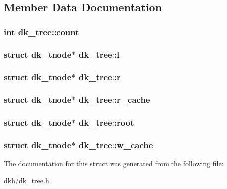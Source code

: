 \subsection{Member Data Documentation}
\hypertarget{structdk__tree_af79ecba1677f82486893accb0859a696}{
\subsubsection[{count}]{\setlength{\rightskip}{0pt plus 5cm}int dk\+\_\+tree\+::count}}\label{structdk__tree_af79ecba1677f82486893accb0859a696}
\hypertarget{structdk__tree_a47101f1a0d29f4be791707a4b4b6477e}{
\subsubsection[{l}]{\setlength{\rightskip}{0pt plus 5cm}struct {\bf dk\+\_\+tnode}$\ast$ dk\+\_\+tree\+::l}}\label{structdk__tree_a47101f1a0d29f4be791707a4b4b6477e}
\hypertarget{structdk__tree_a5d989a0efeadbc970750f1ac8ad4018e}{
\subsubsection[{r}]{\setlength{\rightskip}{0pt plus 5cm}struct {\bf dk\+\_\+tnode}$\ast$ dk\+\_\+tree\+::r}}\label{structdk__tree_a5d989a0efeadbc970750f1ac8ad4018e}
\hypertarget{structdk__tree_ae1a363a68dda726e3010e6766057dbbe}{
\subsubsection[{r\+\_\+cache}]{\setlength{\rightskip}{0pt plus 5cm}struct {\bf dk\+\_\+tnode}$\ast$ dk\+\_\+tree\+::r\+\_\+cache}}\label{structdk__tree_ae1a363a68dda726e3010e6766057dbbe}
\hypertarget{structdk__tree_a6a5c48e2ff2494e10aafd1d0bc9d5992}{
\subsubsection[{root}]{\setlength{\rightskip}{0pt plus 5cm}struct {\bf dk\+\_\+tnode}$\ast$ dk\+\_\+tree\+::root}}\label{structdk__tree_a6a5c48e2ff2494e10aafd1d0bc9d5992}
\hypertarget{structdk__tree_ab968d09f4098a59419b509bce61debcb}{
\subsubsection[{w\+\_\+cache}]{\setlength{\rightskip}{0pt plus 5cm}struct {\bf dk\+\_\+tnode}$\ast$ dk\+\_\+tree\+::w\+\_\+cache}}\label{structdk__tree_ab968d09f4098a59419b509bce61debcb}


The documentation for this struct was generated from the following file\+:\begin{DoxyCompactItemize}
\item 
dkh/\hyperlink{dk__tree_8h}{dk\+\_\+tree.\+h}\end{DoxyCompactItemize}
